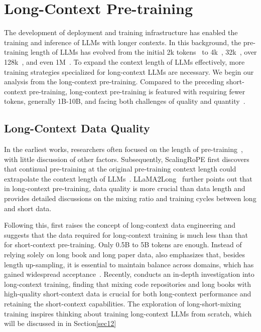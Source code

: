 \section{Long-Context Pre-training}\label{sec8}

The development of deployment and training infrastructure has enabled the training and inference of LLMs with longer contexts. In this background, the pre-training length of LLMs has evolved from the initial 2k tokens~\citep{touvron2023llama} to 4k~\citep{touvron2023llama2}, 32k~\citep{xiaoefficient,cai2024internlm2}, over 128k~\citep{meta2024introducing,InternLM25}, and even 1M~\citep{liu2024world}. To expand the context length of LLMs effectively, more training strategies specialized for long-context LLMs are necessary. We begin our analysis from the long-context pre-training. Compared to the preceding short-context pre-training, long-context pre-training is featured with requiring fewer tokens, generally 1B-10B, and facing both challenges of quality and quantity~\citep{fudata,lv2024longwanjuan}.

\subsection{Long-Context Data Quality}

In the earliest works, researchers often focused on the length of pre-training~\citep{chen2023extending,roziere2023code,pengyarn}, with little discussion of other factors. Subsequently, ScalingRoPE first discovers that continual pre-training at the original pre-training context length could extrapolate the context length of LLMs~\citep{liuscaling}. LLaMA2Long~\citep{xiong2024effective} further points out that in long-context pre-training, data quality is more crucial than data length and provides detailed discussions on the mixing ratio and training cycles between long and short data.

Following this, \citet{fudata} first raises the concept of long-context data engineering and suggests that the data required for long-context training is much less than that for short-context pre-training. Only 0.5B to 5B tokens are enough. Instead of relying solely on long book and long paper data, \citet{fudata} also emphasizes that, besides length up-sampling, it is essential to maintain balance across domains, which has gained widespread acceptance~\citep{zhang2406long,young2024yi,chatglm2024glmlong,gao2024train}. Recently, \citet{gao2024train} conducts an in-depth investigation into long-context training, finding that mixing code repositories and long books with high-quality short-context data is crucial for both long-context performance and retaining the short-context capabilities. The exploration of long-short-mixing training inspires thinking about training long-context LLMs from scratch, which will be discussed in \textbf{} in Section\ref{sec12} 

